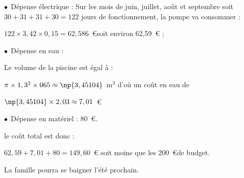 
\medskip

$\bullet~~$Dépense électrique : Sur les mois de juin, juillet, août et septembre soit $30 + 31 + 31 + 30 = 122$ jours de fonctionnement, la pompe va consommer :

$122 \times 3,42 \times 0,15 = 62,586$~\euro soit environ 62,59~\euro{}  ;

$\bullet~~$Dépense en eau :

Le volume de la piscine est égal à :

$\pi \times 1,3 ^2 \times 065 \approx \np{3,45104}$~m$^3$ d'où un coût en eau de 

$\np{3,45104} \times 2,03 \approx 7,01$~\euro  

$\bullet~~$Dépense en matériel : 80~\euro. 

le coût total est donc :

$62,59 + 7,01 + 80 = 149,60$~\euro{} soit moins que les 200~\euro de budget.

La famille pourra se baigner l'été prochain.
